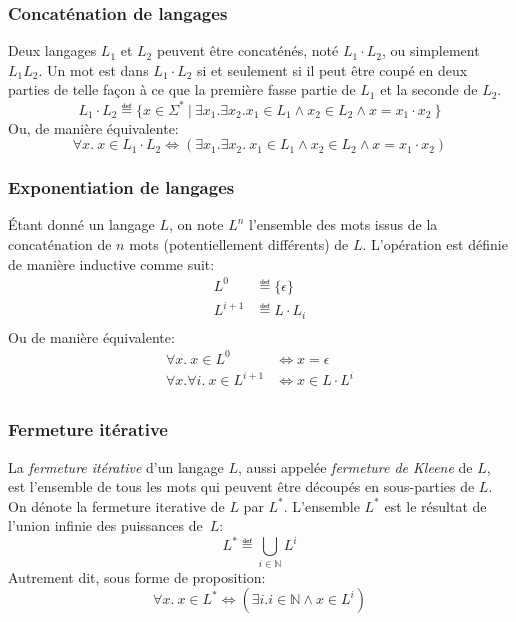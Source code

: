 \subsubsection{Concaténation de langages}

Deux langages $L_1$ et $L_2$ peuvent être concaténés, noté $L_1 \cdot L_2$, ou simplement $L_1L_2$.
Un mot est dans $L_1 \cdot L_2$ si et seulement si il peut être coupé en deux parties de telle façon à ce que la première fasse partie de $L_1$ et la seconde de $L_2$.
\[
L_1 \cdot L_2 \eqdef \{ x \in \Sigma^*\ |\ \exists x_1. \exists x_2. x_1 \in L_1 \wedge x_2 \in L_2 \wedge x = x_1 \cdot x_2\ \}
\]
Ou, de manière équivalente:
\[
\forall x.\ x \in L_1 \cdot L_2 \iff (\exists x_1. \exists x_2.\ x_1 \in L_1 \wedge x_2 \in L_2 \wedge x = x_1 \cdot x_2)
\]

\subsubsection{Exponentiation de langages}

Étant donné un langage $L$, on note $L^n$ l'ensemble des mots issus de la concaténation de $n$ mots (potentiellement différents) de $L$.
L'opération est définie de manière inductive comme suit:
\begin{align*}
L^0 &\eqdef \{ \epsilon \}\\
L^{i + 1} &\eqdef L \cdot L_i\\
\end{align*}
Ou de manière équivalente:
\begin{align*}
\forall x.\ x \in L^0 &\iff x = \epsilon\\
\forall x. \forall i.\ x \in L^{i + 1} &\iff x \in L \cdot L^i\\
\end{align*}

\subsubsection{Fermeture itérative}

La \og \textit{fermeture itérative} \fg{} d'un langage $L$, aussi appelée \og \textit{fermeture de Kleene} \fg{} de $L$, est l'ensemble de tous les mots qui peuvent être découpés en sous-parties de $L$. On dénote la fermeture iterative de $L$ par $L^*$.
L'ensemble $L^*$ est le résultat de l'union infinie des puissances de~$L$:
\[
L^* \eqdef \bigcup_{i \in \mathbb{N}} L^i
\]
Autrement dit, sous forme de proposition:
\[
\forall x.\ x \in L^* \iff (\exists i. i \in \mathbb{N} \wedge x \in L^i)
\]

